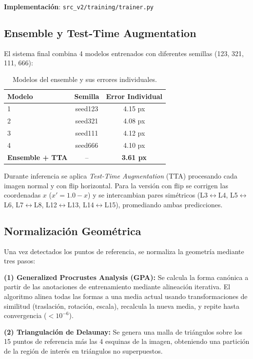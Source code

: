 \documentclass[12pt,a4paper]{article}
\newcommand{\code}[1]{\texttt{#1}}
\begin{document}
\textbf{Implementación}: \code{src\_v2/training/trainer.py}

\subsection{Ensemble y Test-Time Augmentation}

El sistema final combina 4 modelos entrenados con diferentes semillas (123, 321, 111, 666):

\begin{table}[H]
\centering
\begin{tabular}{lcc}
\toprule
\textbf{Modelo} & \textbf{Semilla} & \textbf{Error Individual} \\
\midrule
1 & seed123 & 4.15 px \\
2 & seed321 & 4.08 px \\
3 & seed111 & 4.12 px \\
4 & seed666 & 4.10 px \\
\midrule
\textbf{Ensemble + TTA} & -- & \textbf{3.61 px} \\
\bottomrule
\end{tabular}
\caption{Modelos del ensemble y sus errores individuales.}
\end{table}

Durante inferencia se aplica \textit{Test-Time Augmentation} (TTA) procesando cada imagen normal y con flip horizontal. Para la versión con flip se corrigen las coordenadas $x$ ($x' = 1.0 - x$) y se intercambian pares simétricos (L3$\leftrightarrow$L4, L5$\leftrightarrow$L6, L7$\leftrightarrow$L8, L12$\leftrightarrow$L13, L14$\leftrightarrow$L15), promediando ambas predicciones.

\subsection{Normalización Geométrica}

Una vez detectados los puntos de referencia, se normaliza la geometría mediante tres pasos:

\textbf{(1) Generalized Procrustes Analysis (GPA):} Se calcula la forma canónica a partir de las anotaciones de entrenamiento mediante alineación iterativa. El algoritmo alinea todas las formas a una media actual usando transformaciones de similitud (traslación, rotación, escala), recalcula la nueva media, y repite hasta convergencia ($<10^{-6}$).

\textbf{(2) Triangulación de Delaunay:} Se genera una malla de triángulos sobre los 15 puntos de referencia más las 4 esquinas de la imagen, obteniendo una partición de la región de interés en triángulos no superpuestos.
\end{document}
